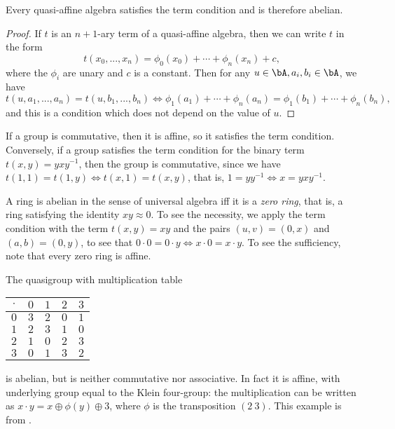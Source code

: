 \begin{prop} Every quasi-affine algebra satisfies the term condition and is therefore abelian.
\end{prop}
\begin{proof} If $t$ is an $n+1$-ary term of a quasi-affine algebra, then we can write $t$ in the form
\[
t(x_0, ..., x_n) = \phi_0(x_0) + \cdots + \phi_n(x_n) + c,
\]
where the $\phi_i$ are unary and $c$ is a constant. Then for any $u \in \bA, a_i, b_i \in \bA$, we have
\[
t(u,a_1, ..., a_n) = t(u,b_1,...,b_n) \iff \phi_1(a_1) + \cdots + \phi_n(a_n) = \phi_1(b_1) + \cdots + \phi_n(b_n),
\]
and this is a condition which does not depend on the value of $u$.
\end{proof}

\begin{ex} If a group is commutative, then it is affine, so it satisfies the term condition. Conversely, if a group satisfies the term condition for the binary term $t(x,y) = yxy^{-1}$, then the group is commutative, since we have $t(1,1) = t(1,y) \iff t(x,1) = t(x,y)$, that is, $1 = yy^{-1} \iff x = yxy^{-1}$.
\end{ex}

\begin{ex} A ring is abelian in the sense of universal algebra iff it is a \emph{zero ring}, that is, a ring satisfying the identity $xy \approx 0$. To see the necessity, we apply the term condition with the term $t(x,y) = xy$ and the pairs $(u,v) = (0,x)$ and $(a,b) = (0,y)$, to see that $0\cdot 0 = 0 \cdot y \iff x\cdot 0 = x\cdot y$. To see the sufficiency, note that every zero ring is affine.
\end{ex}

\begin{ex} The quasigroup with multiplication table
\begin{center}
\begin{tabular}{c|cccc} $\cdot$ & $0$ & $1$ & $2$ & $3$\\ \hline $0$ & $3$ & $2$ & $0$ & $1$\\ $1$ & $2$ & $3$ & $1$ & $0$\\ $2$ & $1$ & $0$ & $2$ & $3$\\ $3$ & $0$ & $1$ & $3$ & $2$\end{tabular}
\end{center}
is abelian, but is neither commutative nor associative. In fact it is affine, with underlying group equal to the Klein four-group: the multiplication can be written as $x\cdot y = x \oplus \phi(y) \oplus 3$, where $\phi$ is the transposition $(2\ 3)$. This example is from \cite{commutator-theory}.
\end{ex}

